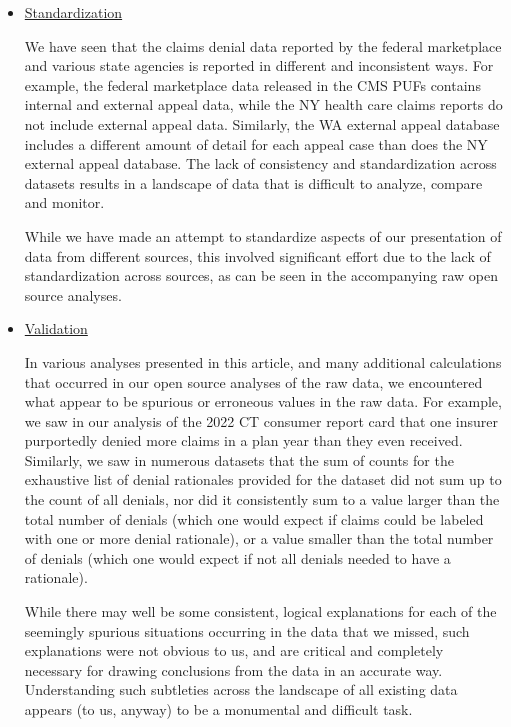 \documentclass[12pt, a4paper,twoside,parskip=full]{report}
\theoremstyle{plain} %
\theoremstyle{definition} %
\theoremstyle{remark} %
\numberwithin{equation}{chapter}
\begin{document}
		\begin{itemize}
			\item \underline{Standardization}
			
			We have seen that the claims denial data reported by the federal marketplace and various state agencies is reported in different and inconsistent ways. For example, the federal marketplace data released in the CMS PUFs contains internal and external appeal data, while the NY health care claims reports do not include external appeal data. Similarly, the WA external appeal database includes a different amount of detail for each appeal case than does the NY external appeal database. The lack of consistency and standardization across datasets results in a landscape of data that is difficult to analyze, compare and monitor.
			
			While we have made an attempt to standardize aspects of our presentation of data from different sources, this involved significant effort due to the lack of standardization across sources, as can be seen in the accompanying raw open source analyses.
			
			\item \underline{Validation}
			
			  In various analyses presented in this article, and many additional calculations that occurred in our open
			source analyses of the raw data, we encountered what appear to be spurious or erroneous values in the raw data. For
			example, we saw in our analysis of the 2022 CT consumer report card that one insurer
			purportedly denied more claims in a plan year than they even received. Similarly, we saw in numerous
			datasets that the sum of counts for the exhaustive list of denial rationales provided for the dataset
			did not sum up to the count of all denials, nor did it consistently sum to a value larger than the total
			number of denials (which one would expect if claims could be labeled with one or more denial rationale),
			or a value smaller than the total number of denials (which one would expect if not all denials needed to
			have a rationale).
			
			 While there may well be some consistent, logical explanations for each of the seemingly spurious 
			situations occurring in the data that we missed, such explanations were not obvious to us, and are critical and completely 
			necessary for drawing conclusions from the data in an accurate way. Understanding such subtleties across 
			the landscape of all existing data appears (to us, anyway) to be a monumental and difficult task.
			

\end{itemize}
\end{document}
